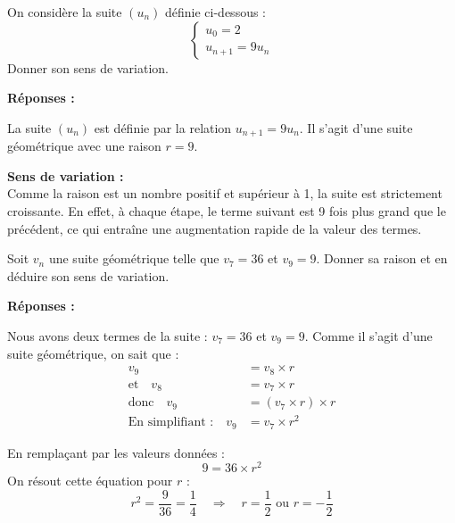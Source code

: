 \documentclass[a4paper,12pt]{article}
\begin{document}
        \begin{tcolorbox}[colback=gray!10, colframe=gray!50, title=Exercice \textbf{130}]
        On considère la suite $(u_n)$ définie ci-dessous :
        \[
        \left\{
          \begin{array}{l}
          u_0 = 2 \\
          u_{n+1} = 9u_n
          \end{array}
        \right.
        \]
        Donner son sens de variation.
        \end{tcolorbox}
        
        \bigskip
        
        \textbf{Réponses :}
        
        La suite $(u_n)$ est définie par la relation $u_{n+1} = 9u_n$. Il s’agit d’une suite géométrique avec une raison $r = 9$.
        
        \textbf{Sens de variation :} \\
        Comme la raison est un nombre positif et supérieur à 1, la suite est strictement croissante. En effet, à chaque étape, le terme suivant est 9 fois plus grand que le précédent, ce qui entraîne une augmentation rapide de la valeur des termes.
        
        \bigskip
        
        \begin{tcolorbox}[colback=gray!10, colframe=gray!50, title=Exercice \textbf{134} page 133]
        Soit $v_n$ une suite géométrique telle que $v_7 = 36$ et $v_9 = 9$. Donner sa raison et en déduire son sens de variation.
        \end{tcolorbox}
        
        \bigskip
        
        \textbf{Réponses :}
        
        Nous avons deux termes de la suite : $v_7 = 36$ et $v_9 = 9$. Comme il s'agit d'une suite géométrique, on sait que :
      \[
      \begin{aligned}
      v_9 &= v_8 \times r \\
      \text{et} \quad v_8 &= v_7 \times r \\
      \text{donc} \quad v_9 &= (v_7 \times r) \times r \\
      \text{En simplifiant :} \quad v_9 &= v_7 \times r^2
      \end{aligned}
      \]
        
        En remplaçant par les valeurs données :
        \[
        9 = 36 \times r^2
        \]
        On résout cette équation pour $r$ :
        \[
        r^2 = \frac{9}{36} = \frac{1}{4} \quad \Rightarrow \quad r = \frac{1}{2} \text{ ou } r = -\frac{1}{2}
        \]
\end{document}
